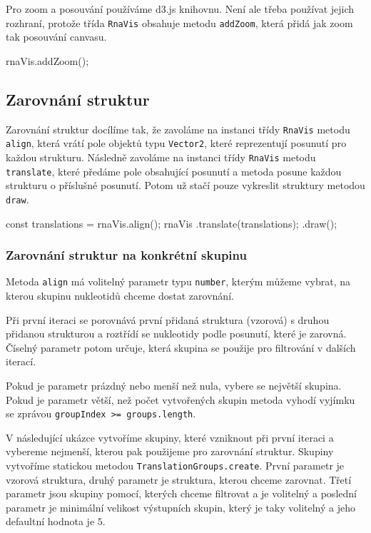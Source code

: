 Pro zoom a posouvání používáme d3.js knihovnu. Není ale třeba používat jejich
rozhraní, protože třída \texttt{RnaVis} obsahuje metodu \texttt{addZoom}, která
přidá jak zoom tak posouvání canvasu.

\begin{code}
rnaVis.addZoom();
\end{code}

\subsection{Zarovnání struktur}

Zarovnání struktur docílíme tak, že zavoláme na instanci třídy \texttt{RnaVis}
metodu \texttt{align}, která vrátí pole objektů typu \texttt{Vector2}, které
reprezentují posunutí pro každou strukturu. Následně zavoláme na instanci třídy
\texttt{RnaVis} metodu \texttt{translate}, které předáme pole obsahující
posunutí a metoda posune každou strukturu o příslušné posunutí. Potom už stačí pouze vykreslit struktury metodou \texttt{draw}.

\begin{code}
const translations = rnaVis.align();
rnaVis
  .translate(translations);
  .draw();
\end{code}

\subsubsection{Zarovnání struktur na konkrétní skupinu}

Metoda \texttt{align} má volitelný parametr typu \texttt{number}, kterým můžeme
vybrat, na kterou skupinu nukleotidů chceme dostat zarovnání.

Při první iteraci se porovnává první přidaná struktura (vzorová) s druhou
přidanou strukturou a roztřídí se nukleotidy podle posunutí, které je zarovná.
Číselný parametr potom určuje, která skupina se použije pro filtrování v
dalších iterací. 

Pokud je parametr prázdný nebo menší než nula, vybere se největší skupina.
Pokud je parametr větší, než počet vytvořených skupin metoda vyhodí vyjímku se
zprávou \texttt{groupIndex >= groups.length}. 

V následující ukázce vytvoříme skupiny, které vzniknout při první iteraci a
vybereme nejmenší, kterou pak použijeme pro zarovnání struktur. Skupiny
vytvoříme statickou metodou \texttt{TranslationGroups.create}. První parametr
je vzorová struktura, druhý parametr je struktura, kterou chceme zarovnat.
Třetí parametr jsou skupiny pomocí, kterých chceme filtrovat a je volitelný a
poslední parametr je minimální velikost výstupních skupin, který je taky
volitelný a jeho defaultní hodnota je $5$.

